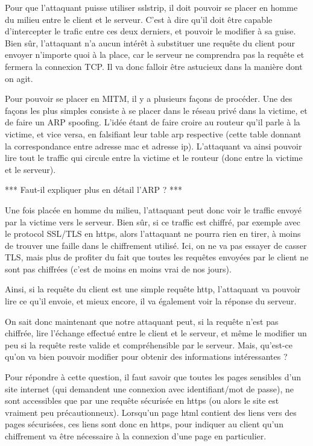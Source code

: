 Pour que l'attaquant puisse utiliser sslstrip, il doit pouvoir se placer en homme du milieu entre le client et le serveur. C'est à dire qu'il doit être capable d'intercepter le trafic entre ces deux derniers, et pouvoir le modifier à sa guise. Bien sûr, l'attaquant n'a aucun intérêt à substituer une requête du client pour envoyer n'importe quoi à la place, car le serveur ne comprendra pas la requête et fermera la connexion TCP. Il va donc falloir être astucieux dans la manière dont on agit.

Pour pouvoir se placer en MITM, il y a plusieurs façons de procéder. Une des façons les plus simples consiste à se placer dans le réseau privé dans la victime, et de faire un ARP spoofing. L'idée étant de faire croire au routeur qu'il parle à la victime, et vice versa, en falsifiant leur table arp respective (cette table donnant la correspondance entre adresse mac et adresse ip). L'attaquant va ainsi pouvoir lire tout le traffic qui circule entre la victime et le routeur (donc entre la victime et le serveur).

*** Faut-il expliquer plus en détail l'ARP ? ***

Une fois placée en homme du milieu, l'attaquant peut donc voir le traffic envoyé par la victime vers le serveur. Bien sûr, si ce traffic est chiffré, par exemple avec le protocol SSL/TLS en https, alors l'attaquant ne pourra rien en tirer, à moins de trouver une faille dans le chiffrement utilisé. Ici, on ne va pas essayer de casser TLS, mais plus de profiter du fait que toutes les requêtes envoyées par le client ne sont pas chiffrées (c'est de moins en moins vrai de nos jours). 

Ainsi, si la requête du client est une simple requête http, l'attaquant va pouvoir lire ce qu'il envoie, et mieux encore, il va également voir la réponse du serveur.

On sait donc maintenant que notre attaquant peut, si la requête n'est pas chiffrée, lire l'échange effectué entre le client et le serveur, et même le modifier un peu si la requête reste valide et compréhensible par le serveur. Mais, qu'est-ce qu'on va bien pouvoir modifier pour obtenir des informations intéressantes ?

Pour répondre à cette question, il faut savoir que toutes les pages sensibles d'un site internet (qui demandent une connexion avec identifiant/mot de passe), ne sont accessibles que par une requête sécurisée en https (ou alors le site est vraiment peu précautionneux). Lorsqu'un page html contient des liens vers des pages sécurisées, ces liens sont donc en https, pour indiquer au client qu'un chiffrement va être nécessaire à la connexion d'une page en particulier.

